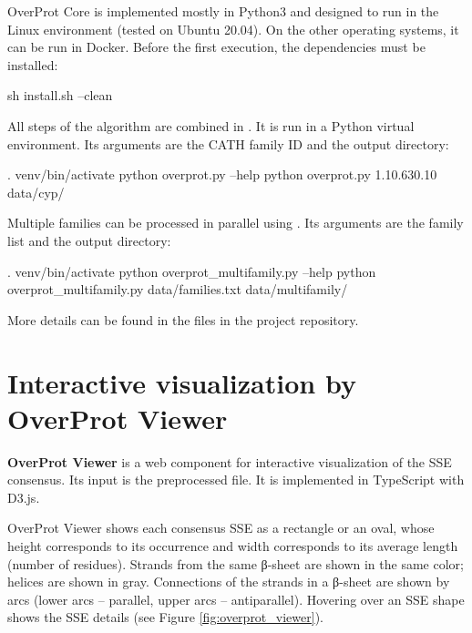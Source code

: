 \documentclass{article}
\begin{document}
OverProt Core is implemented mostly in Python3 
and designed to run in the Linux environment (tested on Ubuntu 20.04).
On the other operating systems, it can be run in Docker.
Before the first execution, the dependencies must be installed:

\begin{codeblock}
  sh install.sh --clean
\end{codeblock}

All steps of the algorithm are combined in . 
It is run in a Python virtual environment. 
Its arguments are the CATH family ID and the output directory:

\begin{codeblock}
  . venv/bin/activate
  python overprot.py --help
  python overprot.py 1.10.630.10 data/cyp/
\end{codeblock}

Multiple families can be processed in parallel using . 
Its arguments are the family list and the output directory:

\begin{codeblock}
  . venv/bin/activate
  python overprot_multifamily.py --help
  python overprot_multifamily.py data/families.txt data/multifamily/
\end{codeblock}

More details can be found in the  files 
in the project repository.


\section{Interactive visualization by OverProt Viewer}

\textbf{OverProt Viewer} is a web component for interactive
visualization of the SSE consensus. Its input is the preprocessed
 file. It is implemented in TypeScript with D3.js.

OverProt Viewer shows each consensus SSE as a rectangle or an oval, whose height 
corresponds to its occurrence 
and width corresponds to its average length (number of residues). 
Strands from the same β-sheet are shown in the same color; helices are shown in gray. 
Connections of the strands in a β-sheet are shown by arcs 
(lower arcs -- parallel, upper arcs -- antiparallel). 
Hovering over an SSE shape shows the SSE details (see Figure \ref{fig:overprot_viewer}).
\end{document}
